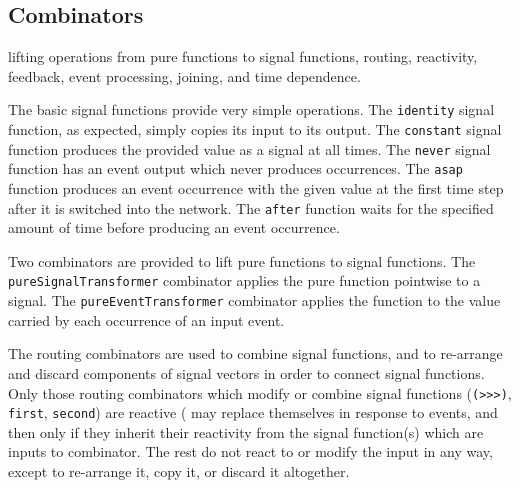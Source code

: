 \subsection{Combinators}
\label{section:System_Design_and_Interface-Combinators}

lifting operations from pure functions to signal functions,
routing, reactivity, feedback, event processing, joining, and time dependence.
%

The basic signal functions
provide very simple operations. The {\tt identity} signal function, as expected,
simply copies its input to its output. The {\tt constant} signal function
produces the provided value as a signal at all times. The {\tt never} signal
function has an event output which never produces occurrences. The {\tt asap}
function produces an event occurrence with the given value at the first time
step after it is switched into the network. The {\tt after} function waits for
the specified amount of time before producing an event occurrence.

Two combinators are provided to lift pure functions to signal functions.
The {\tt pureSignalTransformer} combinator applies the pure function pointwise
to a signal. The {\tt pureEventTransformer} combinator applies the function to
the value carried by each occurrence of an input event.

The routing combinators are used to combine signal functions, and to re-arrange
and discard components of signal vectors in order to connect signal functions.
%
Only those routing combinators which modify or combine signal functions
({\tt (>>>)}, {\tt first}, {\tt second}) are reactive (\ie{} may replace themselves in
response to events, and then only if they inherit their reactivity from the
signal function(s) which are inputs to combinator. The rest do not
react to or modify the input in any way, except to re-arrange it, copy it, or
discard it altogether.

